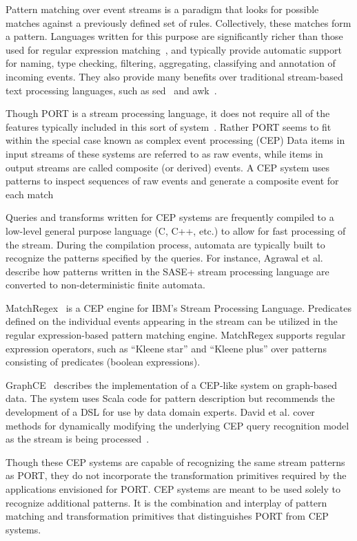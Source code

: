 Pattern matching
over event streams is a paradigm
that looks for
possible matches against a previously defined set of rules. Collectively, these matches form a pattern.
Languages written for this purpose are significantly richer than those used for regular expression
matching~\cite{DBLP:conf/sigmod/AgrawalDGI08},
and typically provide automatic
support for naming, type checking, filtering, aggregating, classifying and
annotation of incoming events. They also  provide many benefits over traditional
stream-based text processing languages, such as sed~\cite{Mcmahon1979sed} and
awk~\cite{DBLP:journals/spe/AhoKW79}.

Though PORT is a stream processing language, it does not
require all of the features typically
included in this sort of system~\cite{DBLP:journals/csur/DayarathnaP18}.
Rather PORT seems to fit within the special case
known as complex event processing (CEP) 
Data items in input streams of these systems are referred to as raw events, while items in output streams are called
composite (or derived) events. A CEP system uses patterns to inspect
sequences of raw events and generate a composite event for each
match~\cite{DBLP:journals/ibmrd/HirzelAGJKKMNSSW13}

Queries and transforms written for CEP systems are
frequently compiled to a low-level general purpose language (C, C++, etc.) to allow for fast
processing of the stream. During the compilation process, automata are typically
built to recognize the patterns specified by the queries. For instance, Agrawal et
al.~\cite{DBLP:conf/sigmod/AgrawalDGI08} describe how patterns written in the SASE+ stream
processing language are converted to non-deterministic finite automata. 

MatchRegex~\cite{DBLP:conf/debs/Hirzel12} is a CEP engine for IBM’s Stream Processing
Language. Predicates defined on the individual events appearing in the
stream can be utilized in the regular expression-based pattern matching
engine. MatchRegex supports regular expression operators, such as “Kleene star”
and “Kleene plus” over patterns consisting of predicates (boolean expressions).

GraphCE~\cite{DBLP:conf/models/BarqueroBTV18} describes the implementation of a CEP-like system on graph-based data. The system uses Scala code for pattern description but recommends the development of a DSL for use by data domain experts.
David et al. cover methods for dynamically modifying the underlying CEP query recognition model as the stream is being processed~\cite{DBLP:journals/sosym/DavidRV18}.

Though these CEP systems are capable
of recognizing the same stream patterns as PORT, they
do not incorporate the
transformation primitives 
required by the applications
envisioned for PORT. CEP systems are meant
to be used solely to recognize additional patterns.
It is the combination and interplay of pattern matching and transformation
primitives that distinguishes PORT from CEP systems.



